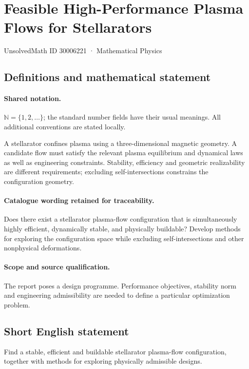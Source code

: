 \documentclass[11pt]{article}
\begin{document}
\setcounter{section}{30006220}
\section{Feasible High-Performance Plasma Flows for Stellarators}\label{30006221}
{\small UnsolvedMath ID 30006221 · Mathematical Physics}
\subsection{Definitions and mathematical statement}

\paragraph{Shared notation.}$\mathbb N=\{1,2,\ldots\}$; the standard number fields have their usual meanings. All additional conventions are stated locally.


A stellarator confines plasma using a three-dimensional magnetic geometry. A candidate flow must satisfy the relevant plasma equilibrium and dynamical laws as well as engineering constraints. Stability, efficiency and geometric realizability are different requirements; excluding self-intersections constrains the configuration geometry.

\paragraph{Catalogue wording retained for traceability.}
Does there exist a stellarator plasma-flow configuration that is simultaneously highly efficient, dynamically stable, and physically buildable? Develop methods for exploring the configuration space while excluding self-intersections and other nonphysical deformations.

\paragraph{Scope and source qualification.}The report poses a design programme. Performance objectives, stability norm and engineering admissibility are needed to define a particular optimization problem.
\subsection{Short English statement}
Find a stable, efficient and buildable stellarator plasma-flow configuration, together with methods for exploring physically admissible designs.
\end{document}
